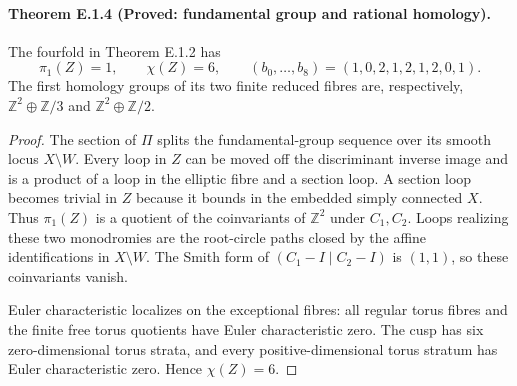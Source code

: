 \paragraph{Theorem E.1.4 (Proved: fundamental group and rational homology).}
The fourfold in Theorem E.1.2 has
\[
 \pi_1(Z)=1,\qquad \chi(Z)=6,\qquad
 (b_0,\ldots,b_8)=(1,0,2,1,2,1,2,0,1).
 \tag{E.8}
\]
The first homology groups of its two finite reduced fibres are,
respectively, $\mathbb Z^2\oplus\mathbb Z/3$ and
$\mathbb Z^2\oplus\mathbb Z/2$.

\begin{proof}
The section of $\Pi$ splits the fundamental-group sequence over its
smooth locus $X\setminus W$.  Every loop in $Z$ can be moved off
the discriminant inverse image and is a product of a loop in the
elliptic fibre and a section loop.  A section loop becomes trivial
in $Z$ because it bounds in the embedded simply connected $X$.
Thus $\pi_1(Z)$ is a quotient of the coinvariants of
$\mathbb Z^2$ under $C_1,C_2$.  Loops realizing these two
monodromies are the root-circle paths closed by the affine
identifications in $X\setminus W$.  The Smith form of
$(C_1-I\mid C_2-I)$ is $(1,1)$, so these coinvariants vanish.

Euler characteristic localizes on the exceptional fibres: all
regular torus fibres and the finite free torus quotients have Euler
characteristic zero.  The cusp has six zero-dimensional torus
strata, and every positive-dimensional torus stratum has Euler
characteristic zero.  Hence $\chi(Z)=6$.


\end{proof}
